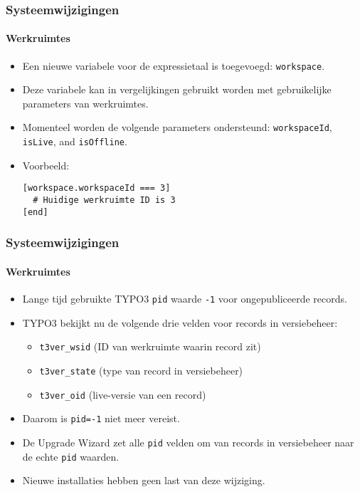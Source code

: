 
\begin{frame}[fragile]
	\frametitle{Systeemwijzigingen}
	\framesubtitle{Werkruimtes}

	\lstset{basicstyle=\smaller\ttfamily}

	\begin{itemize}
		\item Een nieuwe variabele voor de expressietaal is toegevoegd: \texttt{workspace}.
		\item Deze variabele kan in vergelijkingen gebruikt worden met gebruikelijke parameters van werkruimtes.
		\item Momenteel worden de volgende parameters ondersteund:\newline
			\small
				\texttt{workspaceId}, \texttt{isLive}, and \texttt{isOffline}.
			\normalsize
		\item Voorbeeld:
\begin{lstlisting}
[workspace.workspaceId === 3]
  # Huidige werkruimte ID is 3
[end]
\end{lstlisting}

	\end{itemize}

\end{frame}


\begin{frame}[fragile]
	\frametitle{Systeemwijzigingen}
	\framesubtitle{Werkruimtes}

	\begin{itemize}
		\item Lange tijd gebruikte TYPO3 \texttt{pid} waarde \texttt{-1} voor ongepubliceerde records.
		\item TYPO3 bekijkt nu de volgende drie velden voor records in versiebeheer:

			\begin{itemize}
				\item \texttt{t3ver\_wsid} (ID van werkruimte waarin record zit)
				\item \texttt{t3ver\_state} (type van record in versiebeheer)
				\item \texttt{t3ver\_oid} (live-versie van een record)
			\end{itemize}

		\item Daarom is \texttt{pid=-1} niet meer vereist.
		\item De Upgrade Wizard zet alle \texttt{pid} velden om van records in versiebeheer
			naar de echte \texttt{pid} waarden.
		\item Nieuwe installaties hebben geen last van deze wijziging.

	\end{itemize}

\end{frame}

